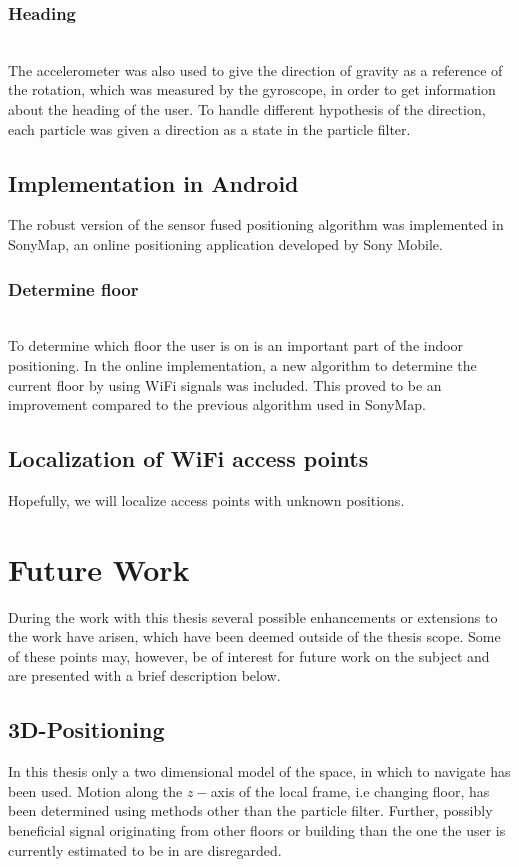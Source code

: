 \documentclass{LTHthesis}
\begin{document}
\subsubsection{Heading} ~\\
The accelerometer was also used to give the direction of gravity as a reference of the rotation, which was measured by the gyroscope, in order to get information about the heading of the user. To handle different hypothesis of the direction, each particle was given a direction as a state in the particle filter.



\subsection{Implementation in Android}
The robust version of the sensor fused positioning algorithm was implemented in SonyMap, an online positioning application developed by Sony Mobile.

\subsubsection{Determine floor} ~\\
To determine which floor the user is on is an important part of the indoor positioning. In the online implementation, a new algorithm to determine the current floor by using WiFi signals was included. This proved to be an improvement compared to the previous algorithm used in SonyMap.



\subsection{Localization of WiFi access points}
Hopefully, we will localize access points with unknown positions.


\section{Future Work}
%
During the work with this thesis several possible enhancements or extensions to the work have arisen, which have been deemed outside of the thesis scope. Some of these points may, however, be of interest for future work on the subject and are presented with a brief description below. 
%
\subsection{3D-Positioning}
%
In this thesis only a two dimensional model of the space, in which to navigate has been used. Motion along the $z-$axis of the local frame, i.e changing floor, has been determined using methods other than the particle filter. Further, possibly beneficial signal originating from other floors or building than the one the user is currently estimated to be in are disregarded.
\end{document}
